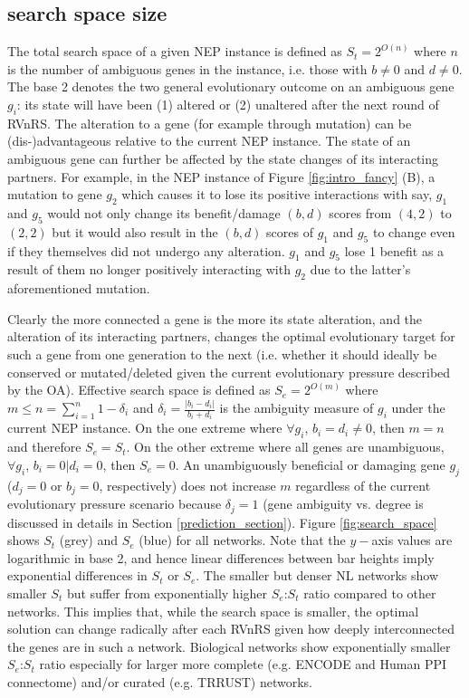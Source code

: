 \documentclass[12pt]{article}
\begin{document}
\subsection{search space size}\label{sec:search_space}

The total search space of a given NEP instance is defined as $S_t = 2^{O(n)}$ where $n$ is the number of ambiguous genes  in the instance, i.e. those with $b\neq 0$ and $d\neq 0$. The base 2 denotes the two general evolutionary outcome on an ambiguous gene $g_i$: its state will have been (1) altered or (2) unaltered after the next round of RVnRS. The alteration to a gene (for example through mutation) can be (dis-)advantageous relative to the current NEP instance. The state of an ambiguous gene can further be affected by the state changes of its interacting partners. For example, in the NEP instance of Figure \ref{fig:intro_fancy} (B), a mutation to gene $g_2$ which causes it to lose its positive interactions with say,  $g_1$ and $g_5$ would not only change its benefit/damage $(b,d)$ scores from $(4,2)$ to $(2,2)$  but it would also result in the $(b,d)$ scores of $g_1$ and $g_5$ to change even if they themselves did not undergo any alteration. $g_1$ and $g_5$ lose 1 benefit as a result of them no longer positively interacting with  $g_2$ due to the  latter's aforementioned mutation.

Clearly the more connected a gene is the more its state alteration, and the alteration of its interacting partners, changes the optimal evolutionary target for such a gene from one generation to the next (i.e. whether it should ideally be conserved or mutated/deleted given the current evolutionary pressure described by the OA). Effective search space is  defined as $S_e=2^{O(m)}$ where $m\leq n=\sum\limits_{i=1}^{n}{1-\delta_i}$ and  ${\delta}_i=\frac{|b_i-d_i|}{b_i+d_i}$ is the ambiguity measure of $g_i$ under the current NEP instance. On the one extreme where $\forall g_i$, $b_i=d_i\neq 0$, then $m=n$ and therefore $S_e=S_t$. On the other extreme where all genes are unambiguous, $\forall g_i$, $b_i=0|d_i=0$, then $S_e=0$.  An unambiguously beneficial or damaging gene $g_j$  ($d_j=0$ or $b_j=0$, respectively) does not increase $m$ regardless of the current evolutionary pressure scenario because $\delta_j = 1$   (gene ambiguity vs.  degree is discussed in details in Section \ref{prediction_section}). Figure \ref{fig:search_space} shows $S_t$ (grey) and $S_e$ (blue) for all networks. Note that the $y-$axis values are logarithmic in base 2, and hence linear differences between bar heights imply exponential differences in $S_t$ or $S_e$. The smaller but denser NL networks show smaller $S_t$ but suffer from exponentially higher $S_e$:$S_t$ ratio compared to other networks. This implies that, while the search space is smaller, the optimal solution can change radically after each RVnRS given how deeply interconnected the genes are in such a network. Biological networks show exponentially smaller $S_e$:$S_t$ ratio especially for larger more complete  (e.g. ENCODE and Human  PPI connectome) and/or curated (e.g. TRRUST) networks.
\end{document}
